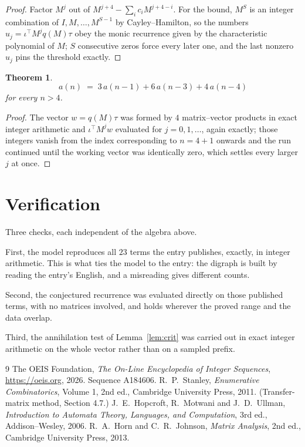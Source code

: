 \documentclass[11pt,a4paper]{article}
\theoremstyle{plain}
\newtheorem{theorem}{Theorem}
\theoremstyle{definition}
\begin{document}
\begin{proof}
Factor $M^{j}$ out of $M^{j+4}-\sum_ic_iM^{j+4-i}$. For the bound, $M^{S}$
is an integer combination of $I,M,\dots,M^{S-1}$ by Cayley--Hamilton, so the numbers
$u_j=\iota^{\!\top}M^{j}q(M)\tau$ obey the monic recurrence given by the characteristic
polynomial of $M$; $S$ consecutive zeros force every later one, and the last nonzero $u_j$
pins the threshold exactly.
\end{proof}

\begin{theorem}
\[
a(n)\;=\;3\,a(n-1) + 6\,a(n-3) + 4\,a(n-4)
\]
for every $n>4$.
\end{theorem}

\begin{proof}
The vector $w=q(M)\tau$ was formed by $4$ matrix--vector products in exact integer
arithmetic and $\iota^{\!\top}M^{j}w$ evaluated for $j=0,1,\dots$, again exactly; those
integers vanish from the index corresponding to $n=4+1$ onwards and the run continued
until the working vector was identically zero, which settles every larger $j$ at once.
\end{proof}

\section{Verification}

Three checks, each independent of the algebra above.

First, the model reproduces all $23$ terms the entry publishes, exactly, in integer
arithmetic. This is what ties the model to the entry: the digraph is built by reading the
entry's English, and a misreading gives different counts.

Second, the conjectured recurrence was evaluated directly on those published terms, with no
matrices involved, and holds wherever the proved range and the data overlap.

Third, the annihilation test of Lemma~\ref{lem:crit} was carried out in exact integer
arithmetic on the whole vector rather than on a sampled prefix.

\begin{thebibliography}{9}
 The OEIS Foundation, \emph{The On-Line Encyclopedia of Integer
Sequences}, \url{https://oeis.org}, 2026. Sequence A184606.
 R.~P.~Stanley, \emph{Enumerative Combinatorics}, Volume 1, 2nd ed.,
Cambridge University Press, 2011. (Transfer-matrix method, Section 4.7.)
 J.~E.~Hopcroft, R.~Motwani and J.~D.~Ullman, \emph{Introduction to Automata
Theory, Languages, and Computation}, 3rd ed., Addison--Wesley, 2006.
 R.~A.~Horn and C.~R.~Johnson, \emph{Matrix Analysis}, 2nd ed., Cambridge
University Press, 2013.
\end{thebibliography}
\end{document}
